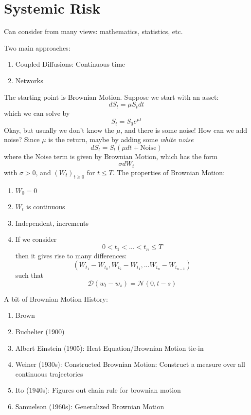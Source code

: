 \section{Systemic Risk}
Can consider from many views: mathematics, statistics, etc.

Two main approaches:
\begin{enumerate}
	\item Coupled Diffusions: Continuous time
	\item Networks
\end{enumerate}

The starting point is Brownian Motion. Suppose we start with an asset:
\begin{equation}
	dS_t = \mu S_t dt
\end{equation}
which we can solve by
\begin{equation}
	S_t = S_0e^{\mu t}
\end{equation}
Okay, but usually we don't know the $\mu$, and there is some noise! How can we add noise? Since $\mu$ is the return, maybe by adding some \emph{white noise}
\begin{equation}
	dS_t = S_t(\mu dt + \text{Noise})
\end{equation}
where the Noise term is given by Brownian Motion, which has the form
\begin{equation}
	\sigma dW_t
\end{equation}
with $\sigma > 0$, and $(W_t)_{t\geq 0}$ for $t\leq T$. The properties of Brownian Motion:
\begin{enumerate}
	\item $W_0=0$
	\item $W_t$ is continuous
	\item Independent, increments
	\item If we consider
	\begin{equation}
		0 < t_1 < ... < t_n \leq T
	\end{equation}
	then it gives rise to many differences:
	\begin{equation}
		(W_{t_1} - W_{t_0}, W_{t_2} - W_{t_1}, ... W_{t_n} - W_{t_{n-1}})
	\end{equation}
	such that
	\begin{equation}
		\mathcal{D}(w_t - w_s) = \mathcal{N}(0, t-s)
	\end{equation}
\end{enumerate}
A bit of Brownian Motion History:
\begin{enumerate}
	\item Brown
	\item Buchelier (1900)
	\item Albert Einstein (1905): Heat Equation/Brownian Motion tie-in
	\item Weiner (1930s): Constructed Brownian Motion: Construct a measure over all continuous trajectories
	\item Ito (1940s): Figures out chain rule for brownian motion
	\item Samuelson (1960s): Generalized Brownian Motion
\end{enumerate}

